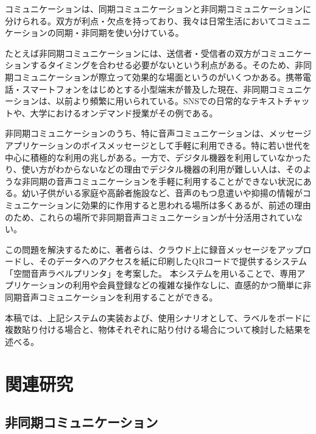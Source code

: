 \documentclass[submit,techrep,noauthor]{ipsj}
\begin{document}
コミュニケーションは、同期コミュニケーションと非同期コミュニケーションに分けられる。双方が利点・欠点を持っており、我々は日常生活においてコミュニケーションの同期・非同期を使い分けている。\par
たとえば非同期コミュニケーションには、送信者・受信者の双方がコミュニケーションするタイミングを合わせる必要がないという利点がある。そのため、非同期コミュニケーションが際立って効果的な場面というのがいくつかある。携帯電話・スマートフォンをはじめとする小型端末が普及した現在、非同期コミュニケーションは、以前より頻繁に用いられている。SNSでの日常的なテキストチャットや、大学におけるオンデマンド授業がその例である。\par
非同期コミュニケーションのうち、特に音声コミュニケーションは、メッセージアプリケーションのボイスメッセージとして手軽に利用できる。特に若い世代を中心に積極的な利用の兆しがある。一方で、デジタル機器を利用していなかったり、使い方がわからないなどの理由でデジタル機器の利用が難しい人は、そのような非同期の音声コミュニケーションを手軽に利用することができない状況にある。幼い子供がいる家庭や高齢者施設など、音声のもつ息遣いや抑揚の情報がコミュニケーションに効果的に作用すると思われる場所は多くあるが、前述の理由のため、これらの場所で非同期音声コミュニケーションが十分活用されていない。\par
この問題を解決するために、著者らは、クラウド上に録音メッセージをアップロードし、そのデータへのアクセスを紙に印刷したQRコードで提供するシステム「空間音声ラベルプリンタ」を考案した。
本システムを用いることで、専用アプリケーションの利用や会員登録などの複雑な操作なしに、直感的かつ簡単に非同期音声コミュニケーションを利用することができる。\par
本稿では、上記システムの実装および、使用シナリオとして、ラベルをボードに複数貼り付ける場合と、物体それぞれに貼り付ける場合について検討した結果を述べる。

\section{関連研究}


\subsection{非同期コミュニケーション}
\end{document}

